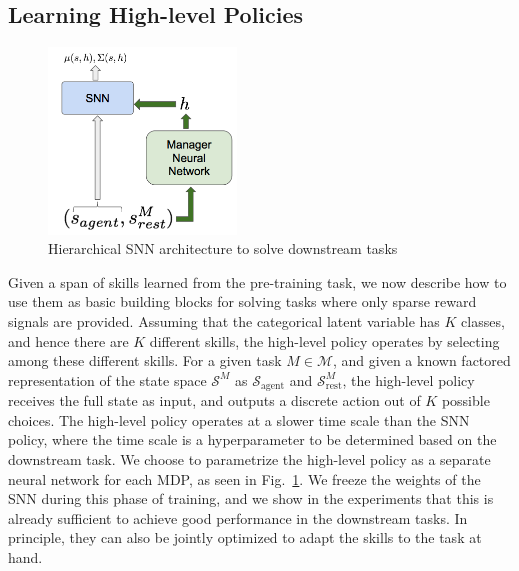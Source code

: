 \documentclass{article} %
\newcommand{\sset}{\mathcal{S}}
\newcommand{\mdpset}{\mathcal{M}}
\newcommand{\agent}{\mathrm{agent}}
\begin{document}
\subsection{Learning High-level Policies}
\label{section:method:highlevel}

\begin{figure}
\includegraphics[width = 5cm]{Figures/hierarchical-SNN.png}
\caption{Hierarchical SNN architecture to solve downstream tasks}
\label{fig:hierarchical_snn_architecture}
\end{figure}

Given a span of skills learned from the pre-training task, we now describe how to use them as basic building blocks for solving tasks where only sparse reward signals are provided. Assuming that the categorical latent variable has $K$ classes, and hence there are $K$ different skills, the high-level policy operates by selecting among these different skills. For a given task $M \in \mdpset$, and given a known factored representation of the state space $\sset^M$ as $\sset_\agent$ and $\sset_{\mathrm{rest}}^M$, the high-level policy receives the full state as input, and outputs a discrete action out of $K$ possible choices. The high-level policy operates at a slower time scale than the SNN policy, where the time scale is a hyperparameter to be determined based on the downstream task. We choose to parametrize the high-level policy as a separate neural network for each MDP, as seen in Fig.\ \ref{fig:hierarchical_snn_architecture}. We freeze the weights of the SNN during this phase of training, and we show in the experiments that this is already sufficient to achieve good performance in the downstream tasks. In principle, they can also be jointly optimized to adapt the skills to the task at hand.  

\end{document}

